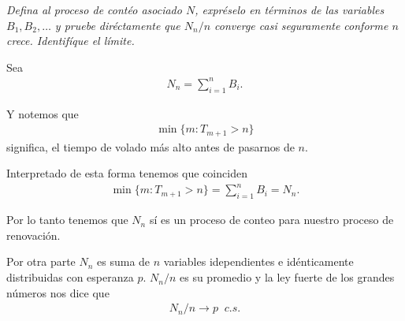 \emph{
    Defina al proceso de contéo asociado $N$, expréselo en términos de las variables $B_1, B_2, \dots$ y pruebe
    diréctamente que $N_n/n$ converge casi seguramente conforme $n$ crece. Identifíque el límite.
}
\afterstatement\pn

Sea
\begin{align}
        N_n = \sum^n_{i = 1} B_i.
\end{align}

Y notemos que 
\begin{align}
        \min \{ m : T_{m+1} > n \} 
\end{align}
significa, el tiempo de volado más alto antes de pasarnos de $n$.\pn

Interpretado de esta forma tenemos que coinciden
\begin{align}
    \min \{ m : T_{m+1} > n \} = \sum^n_{i = 1} B_i = N_n.
\end{align}\pn

Por lo tanto tenemos que $N_n$ sí es un proceso de conteo para nuestro proceso de renovación.\pn

Por otra parte $N_n$ es suma de $n$ variables idependientes e idénticamente distribuidas
con esperanza $p$. $N_n / n$ es su promedio y la ley fuerte de los grandes números nos dice que
\begin{align}
    N_n/n \rightarrow p \;\; c.s.
\end{align}
